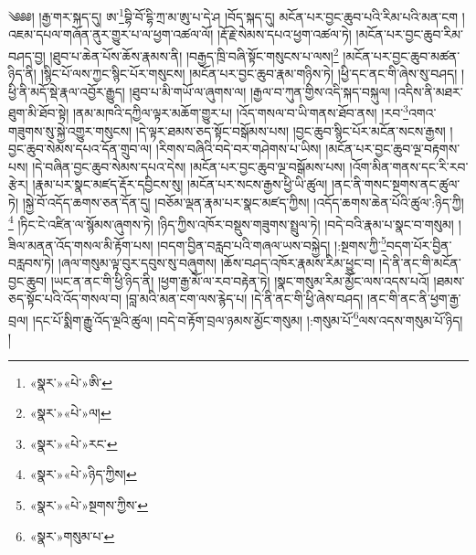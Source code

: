 ༄༅༅། །རྒྱ་གར་སྐད་དུ། ཨ་\footnote{«སྣར་»«པེ་»ཨི་}བྷི་བོ་དྷི་ཀྲ་མ་ཨུ་པ་དེ་ཤ །བོད་སྐད་དུ། མངོན་པར་བྱང་ཆུབ་པའི་རིམ་པའི་མན་ངག །འཇམ་དཔལ་གཞོན་ནུར་གྱུར་པ་ལ་ཕྱག་འཚལ་ལོ། །རྡོ་རྗེ་སེམས་དཔའ་ཕྱག་འཚལ་ཏེ། །མངོན་པར་བྱང་ཆུབ་རིམ་བཤད་བྱ། །ཐུབ་པ་ཆེན་པོས་ཆོས་རྣམས་ནི། །བརྒྱད་ཁྲི་བཞི་སྟོང་གསུངས་པ་ལས།\footnote{«སྣར་»«པེ་»ལ།} །མངོན་པར་བྱང་ཆུབ་མཚན་ཉིད་ནི། །སྙིང་པོ་ལས་ཀྱང་སྙིང་པོར་གསུངས། །མངོན་པར་བྱང་ཆུབ་རྣམ་གཉིས་ཏེ། །ཕྱི་དང་ནང་གི་ཞེས་སུ་བཤད། །ཕྱི་ནི་མདོ་སྡེ་རྣལ་འབྱོར་རྒྱུད། །ཐུབ་པ་མི་གཡོ་ལ་ཞུགས་ལ། །རྒྱལ་བ་ཀུན་གྱིས་འདི་སྐད་བསྐུལ། །འདིས་ནི་མཐར་ཐུག་མི་ཐོབ་སྟེ། །ནམ་མཁའི་དཀྱིལ་ལྟར་མཆོག་གྱུར་པ། །འོད་གསལ་བ་ཡི་གནས་ཐོབ་ནས། །རབ་\footnote{«སྣར་»«པེ་»རང་}འགའ་གཟུགས་སུ་སྐྱེ་འགྱུར་གསུངས། །དེ་ལྟར་ཐམས་ཅད་སྟོང་བསྒོམས་པས། །བྱང་ཆུབ་སྙིང་པོར་མངོན་སངས་རྒྱས། །བྱང་ཆུབ་སེམས་དཔའ་དོན་གྲུབ་ལ། །རིགས་བཞིའི་བདེ་བར་གཤེགས་པ་ཡིས། །མངོན་པར་བྱང་ཆུབ་ལྔ་བརྟགས་པས། །དེ་བཞིན་བྱང་ཆུབ་སེམས་དཔའ་དེས། །མངོན་པར་བྱང་ཆུབ་ལྔ་བསྒོམས་པས། །འོག་མིན་གནས་དང་རི་རབ་རྩེར། །རྣམ་པར་སྣང་མཛད་རྡོར་དབྱིངས་སུ། །མངོན་པར་སངས་རྒྱས་ཕྱི་ཡི་ཚུལ། །ནང་ནི་གསང་སྔགས་ནང་ཚུལ་ཏེ། །སྐྱེ་བོ་འདོད་ཆགས་ཅན་དོན་དུ། །བཅོམ་ལྡན་རྣམ་པར་སྣང་མཛད་ཀྱིས། །འདོད་ཆགས་ཆེན་པོའི་ཚུལ་:ཉིད་ཀྱི།\footnote{«སྣར་»«པེ་»ཉིད་ཀྱིས།} །ཏིང་ངེ་འཛིན་ལ་སྙོམས་ཞུགས་ཏེ། །ཉིད་ཀྱིས་འཁོར་བསྡུས་གཟུགས་སྤྲུལ་ཏེ། །བདེ་བའི་རྣམ་པ་སྣང་བ་གསུམ། །ཟིལ་མནན་འོད་གསལ་མི་རྟོག་པས། །བདག་བྱིན་བརླབ་པའི་གཞལ་ཡས་བསྐྱེད། །:སྔགས་ཀྱི་\footnote{«སྣར་»«པེ་»སྔགས་ཀྱིས་}བདག་པོར་བྱིན་བརླབས་ཏེ། །ཞལ་གསུམ་ལྟ་བུར་དབུས་སུ་བཞུགས། །ཆོས་བཤད་འཁོར་རྣམས་རིམ་ཕྱུང་བ། །དེ་ནི་ནང་གི་མངོན་བྱང་ཆུབ། །ཡང་ན་ནང་གི་ཕྱི་ཉིད་ནི། །ཕྱག་རྒྱ་མོ་ལ་རབ་བརྟེན་ཏེ། །སྣང་གསུམ་རིམ་མྱོང་ལས་འདས་པའོ། །ཐམས་ཅད་སྟོང་པའི་འོད་གསལ་བ། །བླ་མའི་མན་ངག་ལས་རྙེད་པ། །དེ་ནི་ནང་གི་ཕྱི་ཞེས་བཤད། །ནང་གི་ནང་ནི་ཕྱག་རྒྱ་བྲལ། །དང་པོ་སྨིག་རྒྱུ་འོད་ལྔའི་ཚུལ། །བདེ་བ་རྟོག་བྲལ་ཉམས་མྱོང་གསུམ། །:གསུམ་པོ་\footnote{«སྣར་»གསུམ་པ་}ལས་འདས་གསུམ་པོ་ཉིད། །
